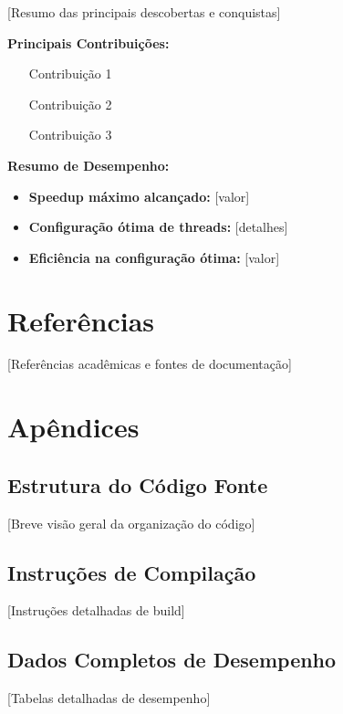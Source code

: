\documentclass[a4paper,11pt]{article}
\begin{document}
[Resumo das principais descobertas e conquistas]

\textbf{Principais Contribuições:}
\begin{itemize}
    \item [Contribuição 1]
    \item [Contribuição 2]
    \item [Contribuição 3]
\end{itemize}

\textbf{Resumo de Desempenho:}
\begin{itemize}
    \item \textbf{Speedup máximo alcançado:} [valor]
    \item \textbf{Configuração ótima de threads:} [detalhes]
    \item \textbf{Eficiência na configuração ótima:} [valor]
\end{itemize}

\section{Referências}

[Referências acadêmicas e fontes de documentação]

\section{Apêndices}

\subsection{Estrutura do Código Fonte}
[Breve visão geral da organização do código]

\subsection{Instruções de Compilação}
[Instruções detalhadas de build]

\subsection{Dados Completos de Desempenho}
[Tabelas detalhadas de desempenho]
\end{document}
